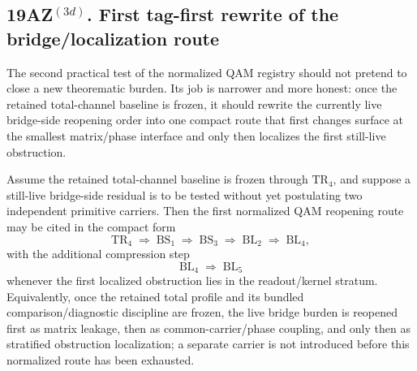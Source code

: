 \subsection*{19AZ$^{(3d)}$. First tag-first rewrite of the bridge/localization route}
\label{sec:first-tag-first-bridge-localization-route}
The second practical test of the normalized QAM registry should not pretend to close a new theorematic burden. Its job is narrower and more honest: once the retained total-channel baseline is frozen, it should rewrite the currently live bridge-side reopening order into one compact route that first changes surface at the smallest matrix/phase interface and only then localizes the first still-live obstruction.

\begin{proposition}
\label{prop:first-tag-first-bridge-localization-route}
Assume the retained total-channel baseline is frozen through \(\mathrm{TR}_4\), and suppose a still-live bridge-side residual is to be tested without yet postulating two independent primitive carriers. Then the first normalized QAM reopening route may be cited in the compact form
\[
 \mathrm{TR}_4 \;\Longrightarrow\; \mathrm{BS}_1 \;\Longrightarrow\; \mathrm{BS}_3 \;\Longrightarrow\; \mathrm{BL}_2 \;\Longrightarrow\; \mathrm{BL}_4,
\]
with the additional compression step
\[
 \mathrm{BL}_4 \;\Longrightarrow\; \mathrm{BL}_5
\]
whenever the first localized obstruction lies in the readout/kernel stratum.
Equivalently, once the retained total profile and its bundled comparison/diagnostic discipline are frozen, the live bridge burden is reopened first as matrix leakage, then as common-carrier/phase coupling, and only then as stratified obstruction localization; a separate carrier is not introduced before this normalized route has been exhausted.
\end{proposition}

